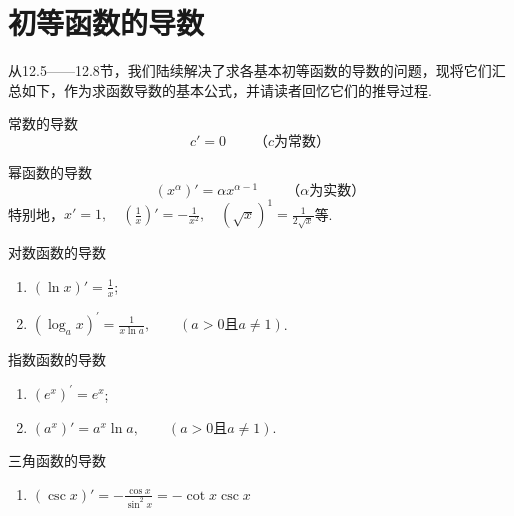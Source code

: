 \section{初等函数的导数}
从12.5——12.8节，我们陆续解决了求各基本初等函数的导数的问题，现将它们汇总如下，作为求函数导数的基本公式，并请读者回忆它们的推导过程.

\begin{thm}{常数的导数}
\[c'=0\qquad \text{（$c$为常数）}\]    
\end{thm}

\begin{thm}
    {幂函数的导数}
\[(x^{\alpha})'=\alpha x^{\alpha-1}\qquad \text{（$\alpha$为实数）}\]
特别地，$x'=1,\quad \left(\frac{1}{x}\right)'=-\frac{1}{x^2},\quad (\sqrt{x})^1=\frac{1}{2\sqrt{x}}$等.
\end{thm}

\begin{thm}
    {对数函数的导数}
\begin{enumerate}[(1)]
\item $(\ln x)' =\frac{1}{x}$;
\item  $( \log _{a}x) ^{\prime }= \frac 1{x\ln a},\qquad ( a> 0\text{且}a\neq1)$.
\end{enumerate}
\end{thm}

\begin{thm}{指数函数的导数}
\begin{enumerate}[(1)]
    \item $( e^x) ^{\prime }= e^x$;
\item $(a^{x})' =a^{x}\ln a,\qquad ( a> 0\text{且} a\neq 1)$.
\end{enumerate}
\end{thm}

\begin{thm}{三角函数的导数}
\begin{enumerate}[(1)]
    \item $\left(\csc x\right)' =-\frac{\cos x}{\sin^{2}x}=-\cot x\csc x$
\end{enumerate}    
\end{thm}

